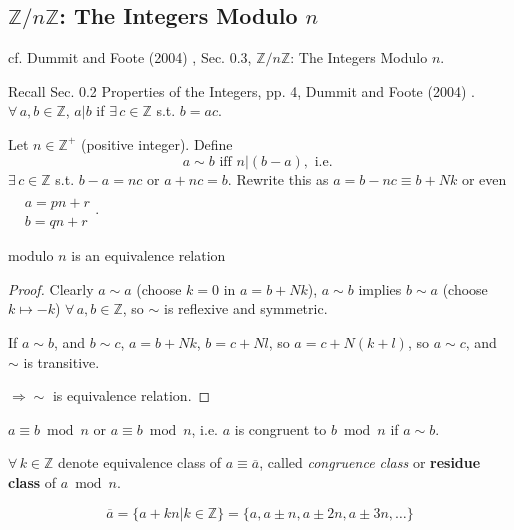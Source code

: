 \subsection{$\mathbb{Z} / n \mathbb{Z}$: The Integers Modulo $n$}

cf. Dummit and Foote (2004) \cite{agat:DuFo2003}, Sec. 0.3, $\mathbb{Z}/n\mathbb{Z}$: The Integers Modulo $n$.

Recall Sec. 0.2 Properties of the Integers, pp. 4, Dummit and Foote (2004) \cite{agat:DuFo2003}. $\forall \, a, b \in \mathbb{Z}$, $a | b$ if $\exists \, c \in \mathbb{Z}$ s.t. $b=ac$. 

\begin{definition}
Let $n\in \mathbb{Z}^+$ (positive integer). Define
\begin{equation}
a \sim b \text{ iff } n | (b-a), \text{ i.e. } 
\end{equation}
$\exists \, c \in \mathbb{Z}$ s.t. $b-a = nc$ or $a+nc = b$. Rewrite this as $a= b- nc \equiv b + Nk$ or even $\begin{aligned} & \quad \\ & a = pn + r \\ & b = qn + r \end{aligned}$. 
\end{definition} 

\begin{proposition}
	modulo $n$ is an equivalence relation
\end{proposition} 

\begin{proof}
Clearly $a \sim a$ (choose $k=0$ in $a= b + Nk$), $a\sim b$ implies $b\sim a$ (choose $k \mapsto -k$) $\forall \, a, b \in \mathbb{Z}$, so $\sim $ is reflexive and symmetric.

If $a\sim b$, and $b\sim c$, $a= b + Nk$, $b=c +Nl$, so $a= c + N(k+l)$, so $a\sim c$, and $\sim$ is transitive.

$\Longrightarrow \sim$ is equivalence relation.

\end{proof} 

$a \equiv b \bmod{n}$ or $a \equiv b \bmod{n}$, i.e. $a$ is congruent to $b \bmod{n}$ if $a\sim b$. 

$\forall \, k \in \mathbb{Z}$ denote equivalence class of $a \equiv \overline{a}$, called \emph{congruence class} or \textbf{residue class} of $a\bmod{n}$.

\begin{equation}
\overline{a} = \lbrace a + kn | k \in \mathbb{Z} \rbrace = \lbrace a , a \pm n, a \pm 2n, a \pm 3n ,\dots \rbrace 
\end{equation}

